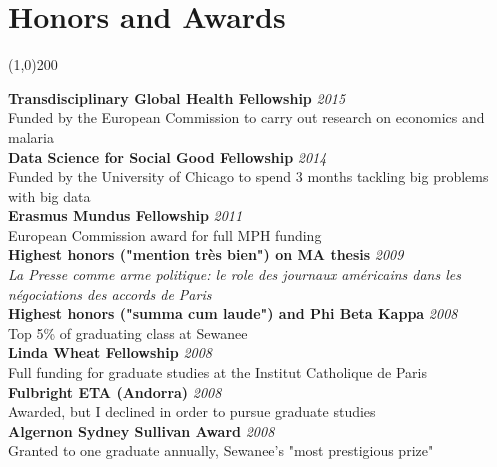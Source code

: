 \documentclass[11pt]{article}
\begin{document}
\newpage



\section*{Honors and Awards} %
\vspace{-7mm}
\line(1,0){200}
\vspace{2mm}

\noindent \textbf{Transdisciplinary Global Health Fellowship} \hfill \emph{2015}\\
\noindent Funded by the European Commission to carry out research on economics and malaria \\


\noindent \textbf{Data Science for Social Good Fellowship} \hfill \emph{2014}\\
\noindent Funded by the University of Chicago to spend 3 months tackling big problems with big data \\

\noindent \textbf{Erasmus Mundus Fellowship} \hfill \emph{2011}\\
\noindent European Commission award for full MPH funding \\

\noindent \textbf{Highest honors ("mention très bien") on MA thesis} \hfill \emph{2009}\\
\noindent \textit{La Presse comme arme politique: le role des journaux américains dans les négociations des accords de Paris}\\

\noindent \textbf{Highest honors ("summa cum laude") and Phi Beta Kappa}  \hfill \emph{2008}\\
\noindent Top 5\% of graduating class at Sewanee  \\

\noindent \textbf{Linda Wheat Fellowship}  \hfill \emph{2008}\\
\noindent Full funding for graduate studies at the Institut Catholique de Paris  \\

\noindent \textbf{Fulbright ETA (Andorra)}  \hfill \emph{2008}\\
\noindent Awarded, but I declined in order to pursue graduate studies \\

\noindent \textbf{Algernon Sydney Sullivan Award}  \hfill \emph{2008}\\
\noindent Granted to one graduate annually, Sewanee's "most prestigious prize" \\
\end{document}
